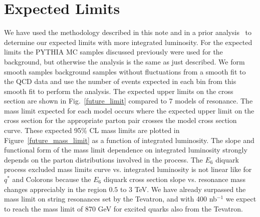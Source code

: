 \section{Expected Limits}

We have used the methodology described in this note and in a prior analysis~\cite{CMS_AN_2009-070} to 
determine our expected limits with more integrated luminosity.  For the expected limits the PYTHIA MC
samples discussed previously were used for the background, but otherwise the analysis is the same 
as just described.  We form smooth samples background samples without fluctuations from a smooth fit
to the QCD data and use the number of events expected in each bin from this smooth fit to perform
the analysis.  The expected upper limits on the cross section are shown in Fig.~\ref{future_limit}
compared to 7 models of resonance.   The mass limit expected for each model occurs where the expected
upper limit on the cross section for the appropriate parton pair crosses the model cross section curve.
These expected 95\% CL mass limits are plotted in Figure~\ref{future_mass_limit} as a function of integrated
luminosity. The slope and functional form of the mass limit dependence
on integrated luminosity strongly depends on the parton distributions involved in the process. The $E_6$ diquark
process excluded mass limits curve vs. integrated luminosity is not linear like for $q^*$ and Colorons because
the $E_6$ diquark cross section slope vs. resonance mass changes appreciably in the region $0.5$ to $3$ TeV.
We have already surpassed the mass limit on string resonances set by the Tevatron, and 
with 400 nb$^{-1}$ we expect to reach the mass limit of 870 GeV for excited quarks also from the Tevatron.




